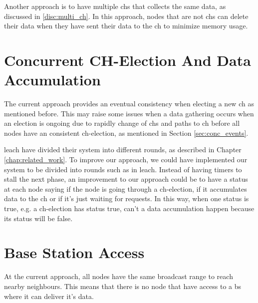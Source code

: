 \documentclass[USenglish]{uit-thesis}
\begin{document}
Another approach is to have multiple \glspl{ch} that collects the same data, as discussed in \autoref{disc:multi_ch}. In this approach, nodes that are not \glspl{ch} can delete their data when they have sent their data to the \gls{ch} to minimize memory usage.




\section{Concurrent CH-Election And Data Accumulation} \label{disc:simult_el_acc}
The current approach provides an eventual consistency when electing a new \gls{ch} as mentioned before. This may raise some issues when a data gathering occurs when an election is ongoing due to rapidly change of \glspl{ch} and paths to \gls{ch} before all nodes have an consistent \gls{ch}-election, as mentioned in Section \ref{sec:conc_events}.


\gls{leach} have divided their system into different rounds, as described in Chapter \ref{chap:related_work}. To improve our approach, we could have implemented our system to be divided into rounds such as in \gls{leach}. Instead of having timers to stall the next phase, an improvement to our approach could be to have a status at each node saying if the node is going through a \gls{ch}-election, if it accumulates data to the \gls{ch} or if it's just waiting for requests. In this way, when one status is true, e.g. a \gls{ch}-election has status true, can't a  data accumulation happen because its status will be false.






\section{Base Station Access} \label{disc:bs_acc}
At the current approach, all nodes have the same broadcast range to reach nearby neighbours. This means that there is no node that have access to a \gls{bs} where it can deliver it's data.
\end{document}
